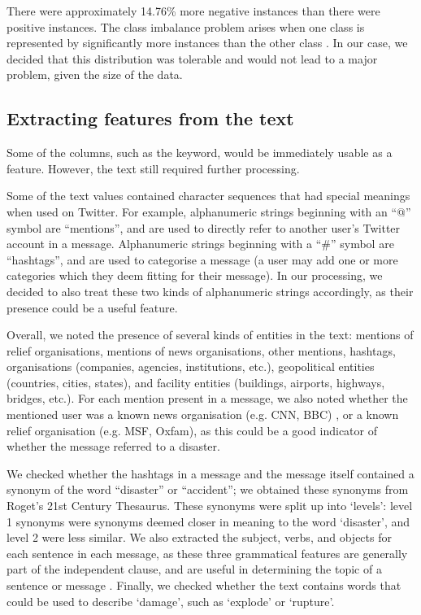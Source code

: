 There were approximately 14.76\% more negative instances than there were positive instances.
The class imbalance problem arises when one class is represented by significantly more instances than the other class \cite{Japkowicz2002}.
In our case, we decided that this distribution was tolerable and would not lead to a major problem, given the size of the data.

\subsection{Extracting features from the text}

Some of the columns, such as the keyword, would be immediately usable as a feature.
However, the text still required further processing.

Some of the text values contained character sequences that had special meanings when used on Twitter.
For example, alphanumeric strings beginning with an ``@'' symbol are ``mentions'', and are used to directly refer to another user's Twitter account in a message.
Alphanumeric strings beginning with a ``\#'' symbol are ``hashtags'', and are used to categorise a message (a user may add one or more categories which they deem fitting for their message).
In our processing, we decided to also treat these two kinds of alphanumeric strings accordingly, as their presence could be a useful feature.

Overall, we noted the presence of several kinds of entities in the text: mentions of relief organisations, mentions of news organisations, other mentions, hashtags, organisations (companies, agencies, institutions, etc.), geopolitical entities (countries, cities, states), and facility entities (buildings, airports, highways, bridges, etc.).
For each mention present in a message, we also noted whether the mentioned user was a known news organisation (e.g.
CNN, BBC) , or a known relief organisation (e.g.
MSF, Oxfam), as this could be a good indicator of whether the message referred to a disaster.


We checked whether the hashtags in a message and the message itself contained a synonym of the word ``disaster'' or ``accident''; we obtained these synonyms from Roget's 21st Century Thesaurus.
These synonyms were split up into `levels': level 1 synonyms were synonyms deemed closer in meaning to the word `disaster', and level 2 were less similar.
We also extracted the subject, verbs, and objects for each sentence in each message, as these three grammatical features are generally part of the
independent clause, and are useful in determining the topic of a sentence or message \cite{nordquist}.
Finally, we checked whether the text contains words that could be used to describe ‘damage’, such as `explode' or `rupture'.

